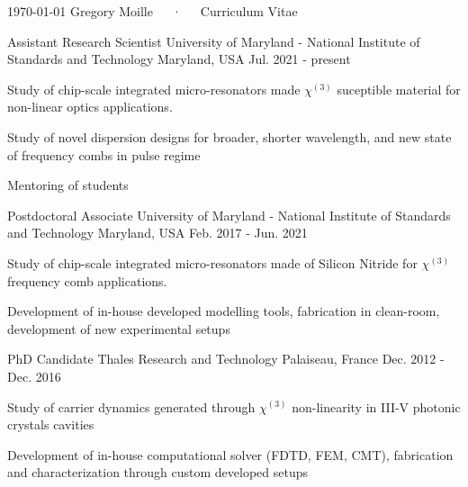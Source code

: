 \documentclass[11pt, letterpaper]{customcv}
\begin{document}
\makecvheader
\makecvfooter
  {\today}
  {Gregory Moille~~~·~~~Curriculum Vitae}
  {\thepage}

%
{%
}
%
{
    \cventry%
        {Assistant Research Scientist} %
        {University of Maryland - National Institute of Standards and Technology} %
        {Maryland, USA} %
        {Jul. 2021 - present} %
        {
          \begin{cvitems} %
            \item {Study of chip-scale integrated micro-resonators made $\chi^{(3)}$ suceptible material for non-linear optics applications.}
            \item{Study of novel dispersion designs for broader, shorter wavelength, and new state of frequency combs in pulse regime}
            \item{Mentoring of students}
          \end{cvitems}
        }
    \cventry%
        {Postdoctoral Associate} %
        {University of Maryland - National Institute of Standards and Technology} %
        {Maryland, USA} %
        {Feb. 2017 - Jun. 2021} %
        {
          \begin{cvitems} %
            \item {Study of chip-scale integrated micro-resonators made of Silicon Nitride for $\chi^{(3)}$ frequency comb applications.}
            \item{Development of in-house developed modelling tools, fabrication in clean-room, development of new experimental setups}
          \end{cvitems}
        }
    \cventry
        {PhD Candidate} %
        {Thales Research and Technology} %
        {Palaiseau, France} %
        {Dec. 2012 - Dec. 2016} %
        {
          \begin{cvitems} %
            \item {Study of carrier dynamics generated through $\chi^{(3)}$ non-linearity in III-V photonic crystals cavities}
            \item {Development of in-house computational solver (FDTD, FEM, CMT), fabrication and characterization through custom developed setups}
          \end{cvitems}
        }
}%
\end{document}
